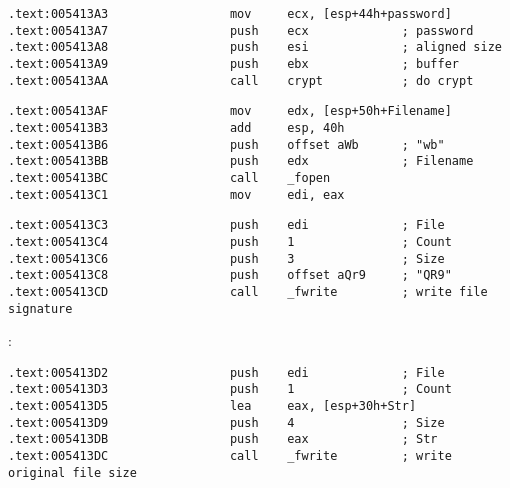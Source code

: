 
\begin{lstlisting}
.text:005413A3                 mov     ecx, [esp+44h+password]
.text:005413A7                 push    ecx             ; password
.text:005413A8                 push    esi             ; aligned size
.text:005413A9                 push    ebx             ; buffer
.text:005413AA                 call    crypt           ; do crypt
\end{lstlisting}


\begin{lstlisting}
.text:005413AF                 mov     edx, [esp+50h+Filename]
.text:005413B3                 add     esp, 40h
.text:005413B6                 push    offset aWb      ; "wb"
.text:005413BB                 push    edx             ; Filename
.text:005413BC                 call    _fopen
.text:005413C1                 mov     edi, eax
\end{lstlisting}


\begin{lstlisting}
.text:005413C3                 push    edi             ; File
.text:005413C4                 push    1               ; Count
.text:005413C6                 push    3               ; Size
.text:005413C8                 push    offset aQr9     ; "QR9"
.text:005413CD                 call    _fwrite         ; write file signature
\end{lstlisting}

:

\begin{lstlisting}
.text:005413D2                 push    edi             ; File
.text:005413D3                 push    1               ; Count
.text:005413D5                 lea     eax, [esp+30h+Str]
.text:005413D9                 push    4               ; Size
.text:005413DB                 push    eax             ; Str
.text:005413DC                 call    _fwrite         ; write original file size
\end{lstlisting}


